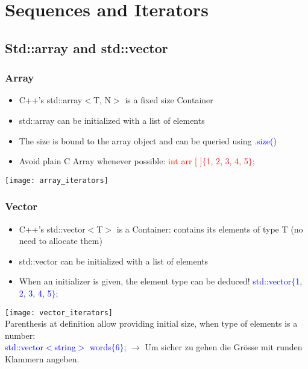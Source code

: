 
\section{Sequences and Iterators}

\subsection{Std::array and std::vector}
\subsubsection{Array}

\begin{itemize}
    \item C++'s std::array$<$T, N$>$ is a fixed size Container
    \item std::array can be initialized with a list of elements 
    \item The size is bound to the array object and can be queried using \textcolor{blue}{.size()}
    \item Avoid plain C Array whenever possible: \textcolor{red}{int arr [ ]$\{$1, 2, 3, 4, 5$\}$;}
\end{itemize}
\texttt{[image: array\_iterators]}
\subsubsection{Vector}
\begin{itemize}
    \item C++'s std::vector$<$T$>$ is a Container: contains its elements of type T (no need to allocate them)
    \item std::vector can be initialized with a list of elements
    \item When an initializer is given, the element type can be deduced! \textcolor{blue}{std::vector$\{$1, 2, 3, 4, 5$\}$;}
\end{itemize}
\texttt{[image: vector\_iterators]}\\
Parenthesis at definition allow providing initial size, when type of elements is a number:\\
\textcolor{blue}{std::vector$<$string$>$ words$\{$6$\}$;} $\rightarrow$ Um sicher zu gehen die Grösse mit runden Klammern angeben.\\

